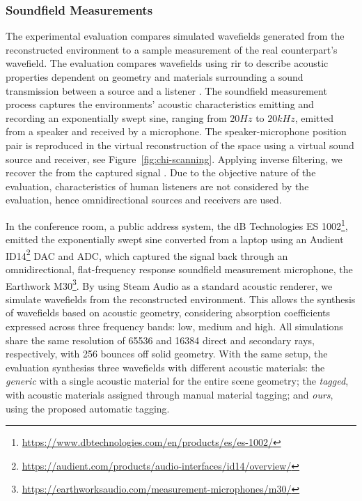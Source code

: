 \subsubsection{Soundfield Measurements}
The experimental evaluation compares simulated wavefields generated from the reconstructed environment to a sample measurement of the real counterpart's wavefield. The evaluation compares wavefields using \acrshort{rir} to describe acoustic properties dependent on geometry and materials surrounding a sound transmission between a source and a listener \citep{stan2002comparison}. The soundfield measurement process captures the environments' acoustic characteristics emitting and recording an exponentially swept sine, ranging from $20Hz$ to $20kHz$, emitted from a speaker and received by a microphone. The speaker-microphone position pair is reproduced in the virtual reconstruction of the space using a virtual sound source and receiver, see Figure~\ref{fig:chi-scanning}. Applying inverse filtering, we recover the  from the captured signal \citep{holters2009impulse}. Due to the objective nature of the evaluation, characteristics of human listeners are not considered by the evaluation, hence omnidirectional sources and receivers are used.\par
In the conference room, a public address system, the dB Technologies ES 1002\footnote{\url{https://www.dbtechnologies.com/en/products/es/es-1002/}}, emitted the exponentially swept sine converted from a laptop using an Audient ID14\footnote{\url{https://audient.com/products/audio-interfaces/id14/overview/}} DAC and ADC, which captured the signal back through an omnidirectional, flat-frequency response soundfield measurement microphone, the Earthwork M30\footnote{\url{https://earthworksaudio.com/measurement-microphones/m30/}}.
By using Steam Audio \citep{audio2020git} as a standard acoustic renderer, we simulate wavefields from the reconstructed environment. This allows the synthesis of wavefields based on acoustic geometry, considering absorption coefficients expressed across three frequency bands: low, medium and high. All simulations share the same resolution of 65536 and 16384 direct and secondary rays, respectively, with 256 bounces off solid geometry. With the same setup, the evaluation synthesiss three wavefields with different acoustic materials: the \emph{generic} with a single acoustic material for the entire scene geometry; the \emph{tagged}, with acoustic materials assigned through manual material tagging; and \emph{ours}, using the proposed automatic tagging.

